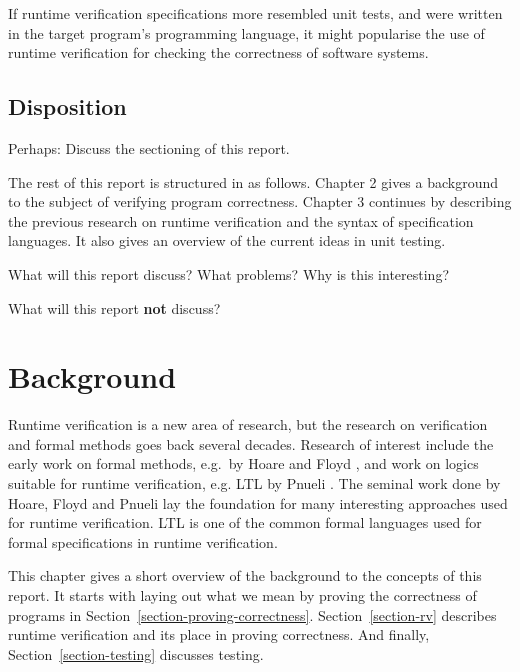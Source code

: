 \documentclass[a4paper,11pt]{kth-mag}
\begin{document}
If runtime verification specifications more resembled unit tests, and were
written in the target program's programming language, it might popularise the
use of runtime verification for checking the correctness of software systems.

\section{Disposition}

Perhaps: Discuss the sectioning of this report.

The rest of this report is structured in as follows. Chapter 2 gives a
background to the subject of verifying program correctness. Chapter 3 continues
by describing the previous research on runtime verification and the syntax of
specification languages. It also gives an overview of the current ideas in unit
testing.

What will this report discuss? What problems? Why is this interesting?

What will this report \textbf{not} discuss?





\pagestyle{newchap}
\chapter{Background} \label{chapter-background}

Runtime verification is a new area of research, but the research on
verification and formal methods goes back several decades. Research of interest
include the early work on formal methods, e.g.\ by Hoare \cite{hoare69} and
Floyd \cite{floyd67}, and work on logics suitable for runtime verification,
e.g. LTL by Pnueli \cite{pnueli77}. The seminal work done by Hoare, Floyd and
Pnueli lay the foundation for many interesting approaches used for runtime
verification. LTL is one of the common formal languages used for formal
specifications in runtime verification.

This chapter gives a short overview of the background to the concepts of this
report. It starts with laying out what we mean by proving the correctness of
programs in Section~\ref{section-proving-correctness}. Section~\ref{section-rv}
describes runtime verification and its place in proving correctness. And
finally, Section~\ref{section-testing} discusses testing.
\end{document}
